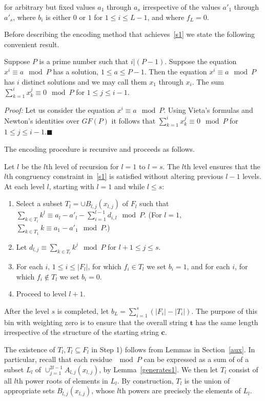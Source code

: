for arbitrary but fixed values $a_1$ through $a_s$ irrespective of
the values ${a'}_1$ through ${a'}_s$, where $b_i$ is either $0$ or
$1$ for $1 \leq i \leq L-1$, and where $f_L=0$.

Before describing the encoding method that achieves~\eqref{s1} we
state the following convenient result.

\begin{lemma}\label{sums} Suppose $P$ is a prime number such that $i|(P-1)$. Suppose the
equation $x^i\equiv a \mod P$ has a solution, $1 \leq a \leq P-1$.
Then the equation $x^i\equiv a \mod P$ has $i$ distinct solutions
\cite{apostol} and we may call them $x_1$ through $x_i$. The sum
$\sum_{k=1}^i x_k^j \equiv 0 \mod P$ for $1 \leq j \leq i-1$.
\end{lemma}
\noindent \textit{Proof:} Let us consider the equation $x^i \equiv a
\mod P$. Using Vieta's formulas and Newton's identities over $GF(P)$
it follows that
 $\sum_{k=1}^i x_k^j \equiv 0 \mod P$ for $1 \leq j \leq
i-1$.\hfill$\blacksquare$

The encoding procedure is recursive and proceeds as follows.

Let $l$ be the $l$th level of recursion for $l=1$ to $l=s$. The
$l$th level ensures that the $l$th congruency constraint
in~\eqref{s1} is satisfied without altering previous $l-1$ levels.
 At each level $l$, starting with $l=1$ and while $l \leq s$:
\begin{enumerate}
 \item Select a subset $T_{l}=\cup B_{l,j}(x_{l,j})$ of $F_l$ such that $\sum_{k \in T_l} k^l \equiv a_l - {a'}_l -
\sum_{i=1}^{l-1} d_{i,l} \mod P$. (For $l=1$, $\sum_{k \in T_1} k
\equiv a_1 - {a'}_1 \mod P$.)\item Let $d_{l,j} \equiv \sum_{k \in
T_l} k^j \mod P$ for $l+1 \leq j\leq s$. \item For each $i$, $1 \leq
i \leq |F_l|$, for which $f_i \in T_l$ we set $b_i=1$, and for each
$i$, for which $f_i \notin T_l$ we set $b_i=0$.
\item Proceed to level $l+1$.
\end{enumerate}

After the level $s$ is completed, let $b_L=\sum_{i=1}^s (|F_i|-
|T_i|)$. The purpose of this bin with weighting zero is to ensure
that the overall string $\mathbf{t}$ has the same length
irrespective of the structure of the starting string $\mathbf{c}$.

The existence of $T_l, T_l \subseteq F_l$ in Step 1) follows from
Lemmas in Section~\ref{aux}. In particular, recall that each residue
$\mod P$ can be expressed as a sum of of a subset $L_{l}$ of
$\cup_{j=1}^{2l-1} A_{l,j}(x_{l,j})$, by Lemma~\ref{generates1}. We
then let $T_l$ consist of all $l$th power roots of elements in
$L_l$. By construction, $T_l$ is the union of appropriate sets
$B_{l,j}(x_{l,j})$, whose $l$th powers are precisely the elements of
$L_l$.






